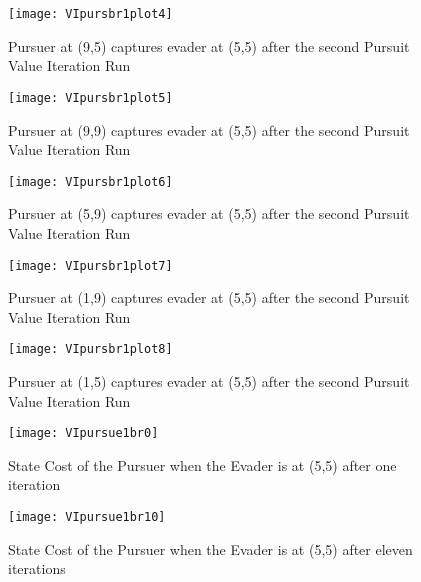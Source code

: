 \begin{figure}
\vspace{2.4in}
\centering
\texttt{[image: VIpursbr1plot4]}
\caption{Pursuer at (9,5) captures evader at (5,5) after the second Pursuit Value Iteration Run}
\label{VIpursbr1plot4}
\end{figure}
\clearpage
\newpage

\begin{figure}
\vspace{2.4in}
\centering
\texttt{[image: VIpursbr1plot5]}
\caption{Pursuer at (9,9) captures evader at (5,5) after the second Pursuit Value Iteration Run}
\label{VIpursbr1plot5}
\end{figure}
\clearpage
\newpage

\begin{figure}
\vspace{2.4in}
\centering
\texttt{[image: VIpursbr1plot6]}
\caption{Pursuer at (5,9) captures evader at (5,5) after the second Pursuit Value Iteration Run}
\label{VIpursbr1plot6}
\end{figure}
\clearpage
\newpage

\begin{figure}
\vspace{2.4in}
\centering
\texttt{[image: VIpursbr1plot7]}
\caption{Pursuer at (1,9) captures evader at (5,5) after the second Pursuit Value Iteration Run}
\label{VIpursbr1plot7}
\end{figure}
\clearpage
\newpage

\begin{figure}
\vspace{2.4in}
\centering
\texttt{[image: VIpursbr1plot8]}
\caption{Pursuer at (1,5) captures evader at (5,5) after the second Pursuit Value Iteration Run}
\label{VIpursbr1plot8}
\end{figure}
\clearpage
\newpage

\begin{figure}
\vspace{2.4in}
\centering
\texttt{[image: VIpursue1br0]}
\caption{State Cost of the Pursuer when the Evader is at (5,5) after one iteration}
\label{VIpursue1br0}
\end{figure}
\clearpage
\newpage

\begin{figure}
\vspace{2.4in}
\centering
\texttt{[image: VIpursue1br10]}
\caption{State Cost of the Pursuer when the Evader is at (5,5) after eleven iterations}
\label{VIpursue1br10}
\end{figure}
\clearpage
\newpage

